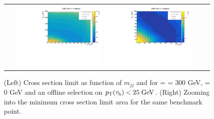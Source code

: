 \begin{figure}[tbh!]
	\centering
	\begin{tabular}{cc}
		\includegraphics[width=0.45\textwidth]{analysis/pics/JetInvMass_vs_MET_xsec_chi300_lsp000_taupt25.pdf}
		\includegraphics[width=0.45\textwidth]{analysis/pics/JetInvMass_vs_MET_xsec_chi300_lsp000_taupt25_zoom.pdf}
	\end{tabular}
	\caption{(Left) Cross section limit as function of $m_{jj}$ and \met for \charginopm = \neutralinotwo = 300 GeV, \neutralinoone = 0 GeV and an offline selection on $p_{\text{T}}(\tau_{\text{h}}) <  25\;\text{Ge}\kern-0.06667em\text{V}$. (Right) Zooming into the minimum cross section limit area for the same benchmark point.}
	\label{fig::JetInvMass_vs_MET_xsec_chi300_lsp000_taupt25}
\end{figure}

